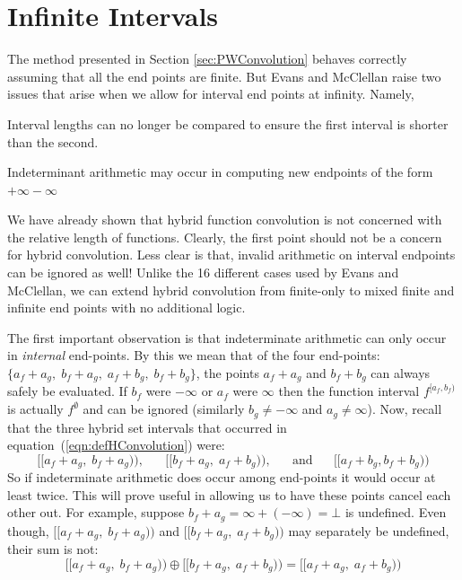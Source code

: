 

%
%
\section{Infinite Intervals}\label{sec:ConvInfty}


The method presented in Section \ref{sec:PWConvolution} behaves correctly assuming that all the end points are finite.
But Evans and McClellan \cite{evans1994algorithms} raise two issues that arise when we allow for interval end points at
infinity. Namely,
\begin{enumerate*}
	\item Interval lengths can no longer be compared to ensure the first interval is shorter than the second.
	\item Indeterminant arithmetic may occur in computing new endpoints of the form $+\infty-\infty$
\end{enumerate*}


We have already shown that hybrid function convolution is not concerned with the relative length of functions. 
Clearly, the first point should not be a concern for hybrid convolution.
Less clear is that, invalid arithmetic on interval endpoints can be ignored as well!
Unlike the 16 different cases used by Evans and McClellan, we can extend hybrid convolution from finite-only to mixed
finite and infinite end points with no additional logic.


The first important observation is that indeterminate arithmetic can only occur in \emph{internal} end-points.
By this we mean that of the four end-points: $\{ a_f+a_g, \; b_f+a_g, \; a_f+b_g, \; b_f+b_g \}$, the points $a_f+a_g$
and $b_f+b_g$ can always safely be evaluated.
If $b_f$ were $-\infty$ or $a_f$ were $\infty$ then the function interval $f^{[a_f,b_f)}$ is actually $f^\emptyset$ and
can be ignored (similarly $b_g \neq -\infty$ and $a_g \neq \infty$).
Now, recall that the three hybrid set intervals that occurred in equation~(\ref{eqn:defHConvolution}) were:
\begin{equation*}
	[\![a_f+a_g, \; b_f+a_g)\!), 
	\;\;\;\;\;\; [\![b_f+a_g, \; a_f+b_g )\!), 
	\;\;\;\;\;\; \text{and} 
	\;\;\;\;\;\; [\![a_f+b_g, b_f+b_g)\!)
\end{equation*}
So if indeterminate arithmetic does occur among end-points it would occur at least twice.
This will prove useful in allowing us to have these points cancel each other out.
For example, suppose $b_f+a_g = \infty+(-\infty) =\bot$ is undefined.
Even though, $[\![a_f+a_g, \; b_f+a_g)\!)$ and ${[\![b_f+a_g, \; a_f+b_g )\!)}$ may separately be undefined, 
their sum is not:
\begin{equation*}
	[\![a_f+a_g, \; b_f+a_g)\!) \oplus [\![b_f+a_g, \; a_f+b_g )\!) = [\![a_f+a_g, \;a_f+b_g)\!)
\end{equation*}


